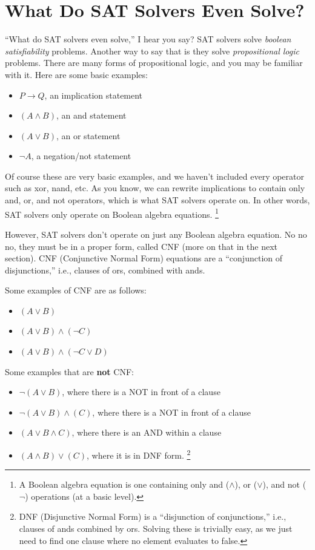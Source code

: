 \section{What Do SAT Solvers Even Solve?}

``What do SAT solvers even solve,'' I hear you say? SAT solvers solve \textit{boolean satisfiability} problems. 
Another way to say that is they solve \textit{propositional logic} problems. 
There are many forms of propositional logic, and you may be familiar with it. Here are some basic examples:

\begin{itemize}
    \item $P \rightarrow Q$, an implication statement
    \item $(A \land B)$, an and statement
    \item $(A \lor B)$, an or statement
    \item $\neg A$, a negation/not statement
\end{itemize}

Of course these are very basic examples, and we haven't included every operator such as xor, 
nand, etc. As you know, we can rewrite implications to contain only and, or, and not operators,
which is what SAT solvers operate on. In other words, SAT solvers only operate on Boolean algebra equations.
\footnote{A Boolean algebra equation is one containing only and ($\land$), or ($\lor$), 
and not ($\neg$) operations (at a basic level).}

However, SAT solvers don't operate on just any Boolean algebra equation. No no no, they must be in a 
proper form, called CNF (more on that in the next section). CNF (Conjunctive Normal Form) equations are a 
``conjunction of disjunctions,'' i.e., clauses of ors, combined with ands.

Some examples of CNF are as follows:

\begin{itemize}
    \item $(A \lor B)$
    \item $(A \lor B) \land (\neg C)$
    \item $(A \lor B) \land (\neg C \lor D)$
\end{itemize}

Some examples that are \textbf{not} CNF:

\begin{itemize}
    \item $\neg(A \lor B)$, where there is a NOT in front of a clause
    \item $\neg(A \lor B) \land (C)$, where there is a NOT in front of a clause
    \item $(A \lor B \land C)$, where there is an AND within a clause
    \item $(A \land B) \lor (C)$, where it is in DNF form.
    \footnote{DNF (Disjunctive Normal Form) is a ``disjunction of conjunctions,'' 
    i.e., clauses of ands combined by ors. Solving these is trivially easy, 
    as we just need to find one clause where no element evaluates to false.}
\end{itemize}

